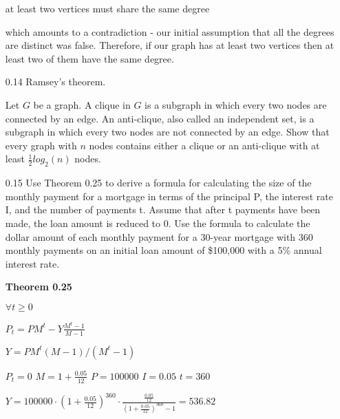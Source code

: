 \begin{enumerate}
          at least two vertices must share the same degree

          which amounts to a contradiction - our initial assumption that all the degrees are distinct was false. Therefore, if our graph has at least two vertices then at least two of them have the same degree.

    \item[0.14]
          Ramsey's theorem.

          Let $G$ be a graph. A clique in $G$ is a subgraph in which every two nodes are connected by an edge. An anti-clique, also called an independent set, is a subgraph in which every two nodes are not connected by an edge. Show that every graph with $n$ nodes contains either a clique or an anti-clique with at least $\frac{1}{2} log_2(n)$ nodes.


    \item[0.15]
          Use Theorem 0.25 to derive a formula for calculating the size of the monthly payment for a mortgage in terms of the principal P, the interest rate I, and the number of payments t. Assume that after t payments have been made, the loan amount is reduced to 0. Use the formula to calculate the dollar amount of each monthly payment for a 30-year mortgage with 360 monthly payments on an initial loan amount of \$100,000 with a 5\% annual interest rate.


          \textbf{Theorem 0.25}

          $\forall t \geq 0$


          $P_t=PM^t-Y\frac{M^t-1}{M-1}$


          $Y = PM^t(M-1)/(M^t-1)$

          $P_t = 0$
          $M = 1 + \frac{0.05}{12}$
          $P = 100000$
          $I = 0.05$
          $t = 360$

          $Y = 100000 \cdot (1 + \frac{0.05}{12})^{360} \cdot \frac{\frac{0.05}{12}}{(1 + \frac{0.05}{12})^{360} - 1} = 536.82$

\end{enumerate}